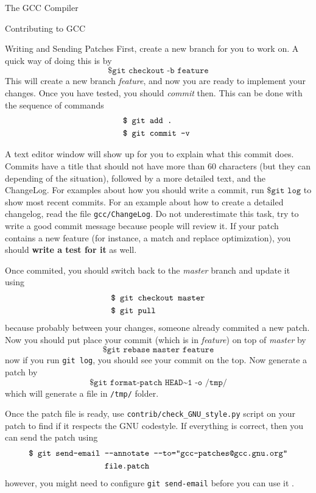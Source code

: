 \begin{section}{The GCC Compiler}
\begin{section}{Contributing to GCC}
\begin{subsection}{Writing and Sending Patches}
	First, create a new branch for you to work on. A quick way of doing
	this is by
	$$\texttt{\$ git checkout -b feature}$$
	This will create a new branch \textit{feature}, and
	now you are ready to implement your changes. Once you have tested, you should
	\textit{commit} then. This can be done with the sequence of commands
\begin{align}
\texttt{\$ } & \texttt{git add .} \nonumber \\
\texttt{\$ } & \texttt{git commit -v \nonumber}
\end{align}

	A text editor window will show up for you to explain what this
	commit does. Commits have a title that should not have more than
	60 characters (but they can depending of the situation),
	followed by a more detailed text, and the
	ChangeLog. For examples about how you should write a commit,
	run $\texttt{\$ git log}$ to show most recent commits. For an example
	about how to create a detailed changelog, read the file
	\texttt{gcc/ChangeLog}. Do not underestimate this task, try to
	write a good commit message because people will review it.
	If your patch contains a new feature (for instance, a match and
	replace optimization), you should \textbf{write a test for it} as
	well.

	Once commited, you should switch back to the \textit{master} branch
	and update it using
\begin{align}
\texttt{\$ } & \texttt{git checkout master} \nonumber \\
\texttt{\$ } & \texttt{git pull \nonumber}
\end{align}
	because probably between your changes, someone already commited a new
	patch. Now you should put place your commit (which is in \textit{feature})
	on top of \textit{master} by
	$$\texttt{\$ git rebase master feature}$$
	now if you run \texttt{git log}, you should see your commit on the top.
	Now generate a patch by
	$$\texttt{\$ git format-patch HEAD\textasciitilde1 -o /tmp/}$$
	which will generate a file in \texttt{/tmp/} folder.

	Once the patch file is ready, use \texttt{contrib/check\_GNU\_style.py}
	script on your patch to find if it respects the GNU codestyle. If
	everything is correct, then you can send the patch using
\begin{align}
\texttt{\$ git send-email} & \texttt{ -{}-annotate  -{}-to="gcc-patches@gcc.gnu.org"} \nonumber \\
& \texttt{ file.patch \nonumber}
\end{align}
however, you might need to configure \texttt{git send-email} before you can use it
\citep{flusp_tavares}.


\end{subsection}
\end{section}
\end{section}

